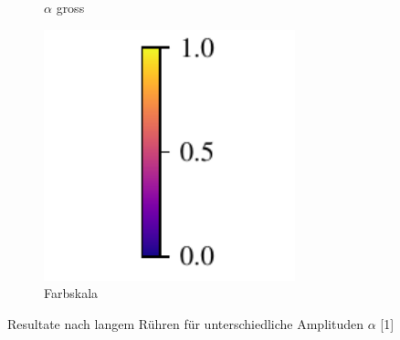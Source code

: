 \begin{frame}
\begin{figure}
\begin{subfigure}{0.32\textwidth}
\caption{$\alpha$ gross}
\end{subfigure}
%
\begin{subfigure}{0.32\textwidth}
\centering
\includegraphics[width=0.8\textwidth]{images/colorbar}
\caption{Farbskala}
\end{subfigure}
\caption{Resultate nach langem Rühren für unterschiedliche Amplituden $\alpha$ {\color{mainColor}[1]}}
\end{figure}

\end{frame}
